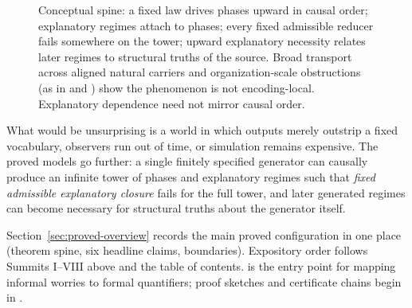 \documentclass[11pt,a4paper]{article}
\theoremstyle{definition}
\begin{document}
\begin{figure}[htbp]
\begin{tikzpicture}
  \end{tikzpicture}
  \caption{Conceptual spine: a fixed law drives phases upward in causal order; explanatory regimes attach to phases; every fixed admissible reducer fails somewhere on the tower; upward explanatory necessity relates later regimes to structural truths of the source. Broad transport across aligned natural carriers and organization-scale obstructions (as in  and ) show the phenomenon is not encoding-local. Explanatory dependence need not mirror causal order.}
  \label{fig:conceptual-spine}
\end{figure}

What would be unsurprising is a world in which outputs merely outstrip a fixed vocabulary, observers run out of time, or simulation remains expensive. The proved models go further: a single finitely specified generator can causally produce an infinite tower of phases and explanatory regimes such that \emph{fixed admissible explanatory closure} fails for the full tower, and later generated regimes can become necessary for structural truths about the generator itself.

\medskip
\noindent
Section~\ref{sec:proved-overview} records the main proved configuration in one place (theorem spine, six headline claims, boundaries). Expository order follows Summits I--VIII above and the table of contents.  is the entry point for mapping informal worries to formal quantifiers; proof sketches and certificate chains begin in .
\end{document}
